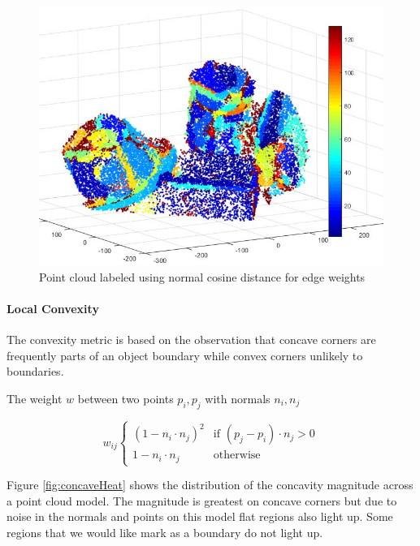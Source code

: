 \documentclass[conference]{IEEEtran}
\begin{document}
\begin{figure}
  \centering
    \includegraphics[width=\linewidth]{img/multiSegment2}
    \caption{Point cloud labeled using normal cosine distance for edge weights}
    \label{fig:cosineDist}
\end{figure}


\paragraph{Local Convexity}
\label{par:convexity}

The convexity metric is based on the observation that concave corners are frequently parts of an object boundary while convex corners unlikely to boundaries\cite{convexity}\cite{object}.

The weight $w$ between two points $p_i, p_j$ with normals $n_i, n_j$

\[
w_{ij}
\begin{cases}
    (1 - n_i \cdot n_j)^2 & \text{if } (p_j - p_i) \cdot n_j > 0 \\
    1 - n_i \cdot n_j     & \text{otherwise}
\end{cases}
\]

Figure \ref{fig:concaveHeat} shows the distribution of the concavity magnitude across a point cloud model. The magnitude is greatest on concave corners but due to noise in the normals and points on this model flat regions also light up. Some regions that we would like mark as a boundary do not light up.
\end{document}

